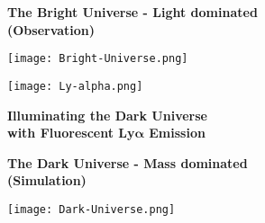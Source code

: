 \documentclass[portrait,a0,final]{a0poster}
\begin{document}
\begin{minipage}{\linewidth}
  \vspace{3cm}
  \begin{center}
    \begin{minipage}{0.33\linewidth}
      \begin{center}
        \vspace{2cm}

        {\Large \textbf{The Bright Universe - Light dominated}} \\
        {\Large \textbf{(Observation)}} \\

        \vspace{1.5cm}

        \texttt{[image: Bright-Universe.png]}
      \end{center}
    \end{minipage}
    \begin{minipage}{0.29\linewidth}
      \begin{center}
        \texttt{[image: Ly-alpha.png]}

        \vspace{1.5cm}

        {\Large \textbf{Illuminating the Dark Universe}} \\
        {\Large \textbf{with Fluorescent Ly$\symbf{\alpha}$ Emission}} \\
      \end{center}
    \end{minipage}
    \begin{minipage}{0.33\linewidth}
      \begin{center}
        \vspace{2cm}

        {\Large \textbf{The Dark Universe - Mass dominated}} \\
        {\Large \textbf{(Simulation)}} \\

        \vspace{1.5cm}

        \texttt{[image: Dark-Universe.png]}
      \end{center}
    \end{minipage}
  \end{center}


\end{minipage}
\end{document}
